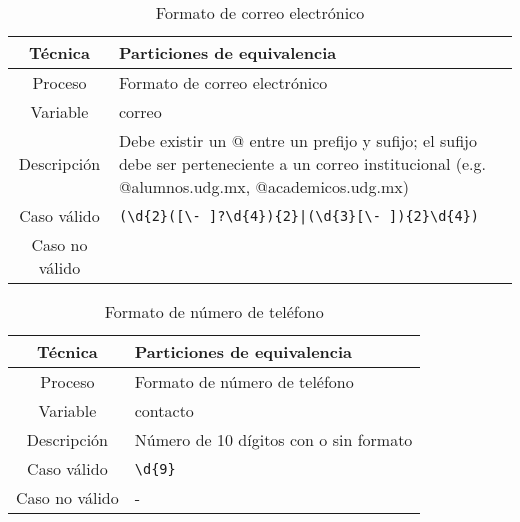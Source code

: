 \restoregeometry %


\clearpage
\listoffigures



\clearpage
\vspace*{-16pt}
\begin{center}
	{\textbf{\huge \theTitle}}
\end{center}
\vspace*{8pt}

\begin{table}[h!]
	\centering
	\begin{tabular}{|c|p{10cm}|}
		\hline
		\textbf{Técnica} & \textbf{Particiones de equivalencia}                                                                                                                  \\
		\hline
		Proceso          & Formato de correo electrónico                                                                                                                         \\
		\hline
		Variable         & correo                                                                                                                                                \\
		\hline
		Descripción      & Debe existir un @ entre un prefijo y sufijo; el sufijo debe ser perteneciente a un correo institucional (e.g. @alumnos.udg.mx, @academicos.udg.mx)    \\
		\hline
		Caso válido      & \texttt{(\textbackslash d\{2\}([\textbackslash - ]?\textbackslash d\{4\})\{2\}|(\textbackslash d\{3\}[\textbackslash - ])\{2\}\textbackslash d\{4\})} \\
		\hline
		Caso no válido   &                                                                                                                                                       \\
		\hline
	\end{tabular}
	\caption{Formato de correo electrónico}
\end{table}

\begin{table}[h!]
	\centering
	\begin{tabular}{|c|p{10cm}|}
		\hline
		\textbf{Técnica} & \textbf{Particiones de equivalencia}   \\
		\hline
		Proceso          & Formato de número de teléfono          \\
		\hline
		Variable         & contacto                               \\
		\hline
		Descripción      & Número de 10 dígitos con o sin formato \\
		\hline
		Caso válido      & \texttt{\textbackslash d\{9\}}         \\
		\hline
		Caso no válido   & -                                      \\
		\hline
	\end{tabular}
	\caption{Formato de número de teléfono}
\end{table}

